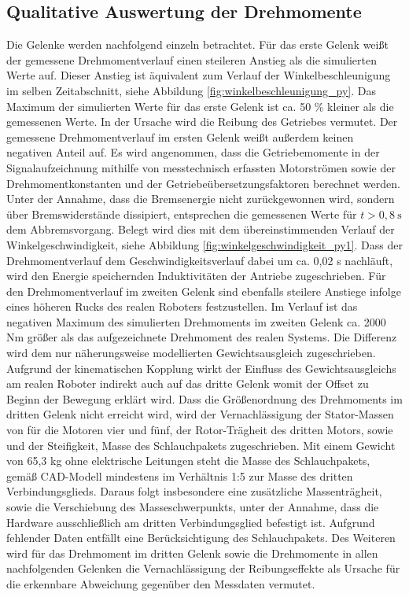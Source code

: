 \subsection*{Qualitative Auswertung der Drehmomente}
Die Gelenke werden nachfolgend einzeln betrachtet. Für das erste Gelenk weißt der gemessene Drehmomentverlauf einen steileren Anstieg als die simulierten Werte auf. Dieser Anstieg ist äquivalent zum Verlauf der Winkelbeschleunigung im selben Zeitabschnitt, siehe Abbildung \ref{fig:winkelbeschleunigung_py}. Das Maximum der simulierten Werte für das erste Gelenk ist ca. 50 \% kleiner als die gemessenen Werte. In der Ursache wird die Reibung des Getriebes vermutet. Der gemessene Drehmomentverlauf im ersten Gelenk weißt außerdem keinen negativen Anteil auf. Es wird angenommen, dass die Getriebemomente in der Signalaufzeichnung mithilfe von messtechnisch erfassten Motorströmen sowie der Drehmomentkonstanten und der Getriebeübersetzungsfaktoren berechnet werden. Unter der Annahme, dass die Bremsenergie nicht zurückgewonnen wird, sondern über Bremswiderstände dissipiert, entsprechen die gemessenen Werte für $t>0,8~\text{s}$ dem  Abbremsvorgang. Belegt wird dies mit dem übereinstimmenden Verlauf der Winkelgeschwindigkeit, siehe Abbildung \ref{fig:winkelgeschwindigkeit_py1}. Dass der Drehmomentverlauf dem Geschwindigkeitsverlauf dabei um ca. 0,02 s nachläuft, wird den Energie speichernden Induktivitäten der Antriebe zugeschrieben. Für den Drehmomentverlauf im zweiten Gelenk sind ebenfalls steilere Anstiege infolge eines höheren Rucks des realen Roboters festzustellen. Im Verlauf ist das negativen Maximum des simulierten Drehmoments im zweiten Gelenk ca. 2000 Nm größer als das aufgezeichnete Drehmoment des realen Systems. Die Differenz wird dem nur näherungsweise modellierten Gewichtsausgleich zugeschrieben. Aufgrund der kinematischen Kopplung wirkt der Einfluss des Gewichtsausgleichs am realen Roboter indirekt auch auf das dritte Gelenk womit der Offset zu Beginn der Bewegung erklärt wird. Dass die Größenordnung des Drehmoments im dritten Gelenk nicht erreicht wird, wird der Vernachlässigung der Stator-Massen von für die Motoren vier und fünf, der Rotor-Trägheit des dritten Motors, sowie und der Steifigkeit, Masse des Schlauchpakets zugeschrieben. Mit einem Gewicht von 65,3 kg ohne elektrische Leitungen steht die Masse des Schlauchpakets, gemäß CAD-Modell mindestens im Verhältnis 1:5 zur Masse des dritten Verbindungsglieds. Daraus folgt insbesondere eine zusätzliche Massenträgheit, sowie die Verschiebung des Masseschwerpunkts, unter der Annahme, dass die Hardware ausschließlich am dritten Verbindungsglied befestigt ist. Aufgrund fehlender Daten entfällt eine Berücksichtigung des Schlauchpakets. Des Weiteren wird für das Drehmoment im dritten Gelenk sowie die Drehmomente in allen nachfolgenden Gelenken die Vernachlässigung  der Reibungseffekte als Ursache für die erkennbare Abweichung gegenüber den Messdaten vermutet. 
